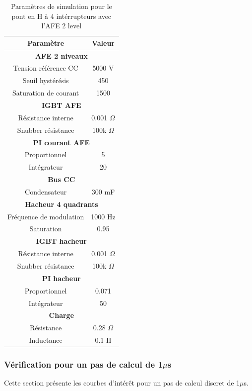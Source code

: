 \documentclass[11pt,letterpaper,final]{report}
\begin{document}
\begin{table}[htb]
\centering
\begin{tabular}{|c|c|} 
  \hline
  \textbf{Paramètre} & \textbf{Valeur}  \\
  \hline\hline \hline
  \multicolumn{2}{|c|}{\textbf{AFE 2 niveaux}}\\ \hline \hline 
  Tension référence CC & 5000 V\\ \hline
  Seuil hystérésis & 450\\ \hline
  Saturation de courant& 1500 \\ \hline \hline
  \multicolumn{2}{|c|}{\textbf{IGBT AFE}}\\ \hline
  Résistance interne & 0.001 $\Omega$\\
  Snubber résistance & 100k $\Omega$\\ \hline \hline
   \multicolumn{2}{|c|}{\textbf{PI courant AFE}}\\ \hline
  Proportionnel & 5 \\
  Intégrateur & 20 \\ \hline \hline
  \multicolumn{2}{|c|}{\textbf{Bus CC}}\\ \hline
  Condensateur & 300 mF\\
  \hline \hline \hline
  
  \multicolumn{2}{|c|}{\textbf{Hacheur 4 quadrants}}\\ \hline \hline
  Fréquence de modulation & 1000 Hz\\ \hline
  Saturation & 0.95 \\ \hline \hline
  \multicolumn{2}{|c|}{\textbf{IGBT hacheur}}\\ \hline
  Résistance interne & 0.001 $\Omega$\\
  Snubber résistance & 100k $\Omega$\\ \hline \hline
   \multicolumn{2}{|c|}{\textbf{PI hacheur}}\\ \hline
  Proportionnel & 0.071 \\
  Intégrateur & 50 \\ \hline \hline
  \multicolumn{2}{|c|}{\textbf{Charge}}\\ \hline
  Résistance & 0.28 $\Omega$\\
  Inductance & 0.1 H\\
  \hline
\end{tabular}
\caption{Paramètres de simulation pour le pont en H à 4 intérrupteurs avec l'AFE 2 level}
\label{p_AF_hash}
\end{table}

\subsubsection{Vérification pour un pas de calcul de 1$\mu$s}
Cette section présente les courbes d'intérêt pour un pas de calcul discret de 1$\mu$s. 
\end{document}
